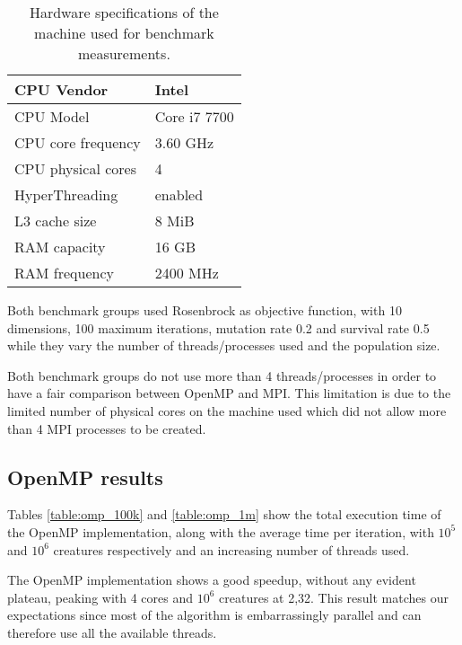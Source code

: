 \documentclass[12pt,a4paper,oneside]{article}
\begin{document}
	\begin{table}[!ht]
		\centering
		\begin{tabular}{|l|l|}
			\hline
			CPU Vendor         & Intel        \\ \hline
			CPU Model          & Core i7 7700 \\ \hline
			CPU core frequency & 3.60 GHz     \\ \hline
			CPU physical cores & 4            \\ \hline
			HyperThreading     & enabled      \\ \hline
			L3 cache size      & 8 MiB        \\ \hline
			RAM capacity       & 16 GB        \\ \hline
			RAM frequency      & 2400 MHz     \\ \hline
		\end{tabular}
		\caption{Hardware specifications of the machine used for benchmark measurements.}
		\label{hw-specs}
	\end{table}

	Both benchmark groups used Rosenbrock as objective function, with 10 dimensions, 100 maximum iterations, mutation rate 0.2 and survival rate 0.5 while they vary the number of threads/processes used and the population size.

	Both benchmark groups do not use more than 4 threads/processes in order to have a fair comparison between OpenMP and MPI.
	This limitation is due to the limited number of physical cores on the machine used which did not allow more than 4 MPI processes to be created.

	\subsection{OpenMP results}
	Tables \ref{table:omp_100k} and \ref{table:omp_1m} show the total execution time of the OpenMP implementation, along with the average time per iteration, with $10^5$ and $10^6$ creatures respectively and an increasing number of threads used.

	The OpenMP implementation shows a good speedup, without any evident plateau, peaking with 4 cores and $10^6$ creatures at 2,32.
	This result matches our expectations since most of the algorithm is embarrassingly parallel and can therefore use all the available threads.
\end{document}
